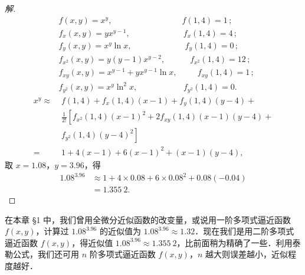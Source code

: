 \begin{proof}[解]
\[
\begin{aligned}
&f(x,y)=x^{y},\qquad\qquad\qquad\qquad\ \ f(1,4)=1\,;\\
&f_{x}(x,y)=yx^{y-1},\qquad\qquad\qquad\ \ f_{x}(1,4)=4\,;\\
&f_{y}(x,y)=x^{y}\ln x,\qquad\qquad\qquad\ \ f_{y}(1,4)=0\,;\\
&f_{x^{2}}(x,y)=y(y-1)x^{y-2},\qquad\quad f_{x^{2}}(1,4)=12\,;\\
&f_{xy}(x,y)=x^{y-1}+yx^{y-1}\ln x,\qquad\ \ f_{xy}(1,4)=1\,;\\
&f_{y^{2}}(x,y)=x^{y}\ln^{2}x,\qquad\qquad\quad\;\; f_{y^{2}}(1,4)=0.
\end{aligned}
\]
\[
\begin{aligned}
x^{y}\approx\;&f(1,4)+f_{x}(1,4)(x-1)+f_{y}(1,4)(y-4)+\\
&\frac{1}{2!}\left[f_{x^{2}}(1,4)(x-1)^{2}+2f_{xy}(1,4)(x-1)(y-4)+\right.\\
&\left.f_{y^{2}}(1,4)(y-4)^{2}\right]\\
=\;&1+4(x-1)+6(x-1)^{2}+(x-1)(y-4),
\end{aligned}
\]
取 $x=1.08$，$y=3.96$，得
\[
\begin{aligned}
1.08^{3.96}&\approx 1+4\times 0.08+6\times 0.08^{2}+0.08(-0.04)\\
&=1.355\ 2.
\end{aligned}
\]
\end{proof}

在本章 §1 中，我们曾用全微分近似函数的改变量，或说用一阶多项式逼近函数 $f(x,y)$，计算过 $1.08^{3.96}$ 的近似值为 $1.08^{3.96}\approx 1.32$．现在我们是用二阶多项式逼近函数 $f(x,y)$，得近似值 $1.08^{3.96}\approx 1.355\ 2$，比前面稍为精确了一些．利用泰勒公式，我们还可用 $n$ 阶多项式逼近函数 $f(x,y)$，$n$ 越大则误差越小，近似程度越好．

